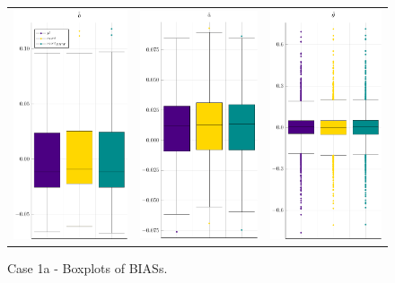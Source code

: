 \begin{figure}[H] 
	\centering \begin{tabular}[b]{c c c}
		\includegraphics[width=.3\textwidth]{Figures/1a/BIAS_b.pdf} & \includegraphics[width=.3\textwidth]{Figures/1a/BIAS_a.pdf} & \includegraphics[width=.3\textwidth]{Figures/1a/BIAS_t.pdf}
	\end{tabular}
	\caption{Case 1a - Boxplots of BIASs.}
	\label{fig:bpBIAS1a}
\end{figure}
